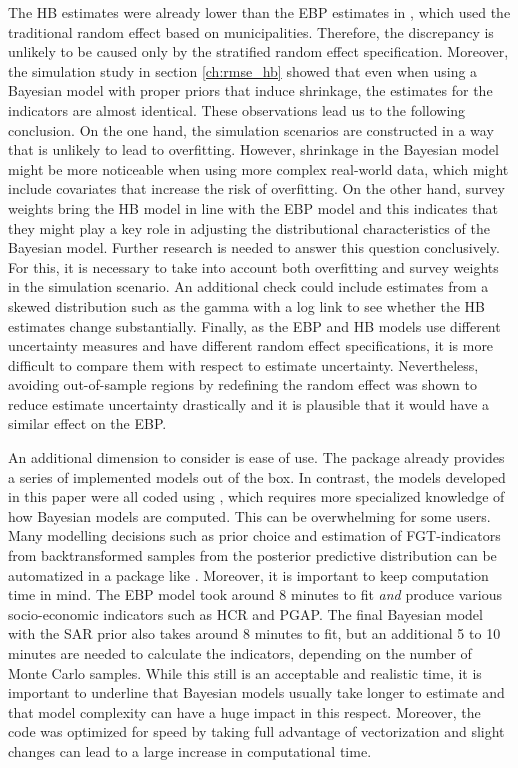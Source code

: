 The HB estimates were already lower than the EBP estimates in \cite{morelli_hierarchical_2021}, which used the traditional random effect based on municipalities.
Therefore, the discrepancy is unlikely to be caused only by the stratified random effect specification.
Moreover, the simulation study in section \ref{ch:rmse_hb} showed that even when using a Bayesian model with proper priors that induce shrinkage, the estimates for the indicators are almost identical.
These observations lead us to the following conclusion.
On the one hand, the simulation scenarios are constructed in a way that is unlikely to lead to overfitting.
However, shrinkage in the Bayesian model might be more noticeable when using more complex real-world data, which might include covariates that increase the risk of overfitting.
On the other hand, survey weights bring the HB model in line with the EBP model and this indicates that they might play a key role in adjusting the distributional characteristics of the Bayesian model.
Further research is needed to answer this question conclusively.
For this, it is necessary to take into account both overfitting and survey weights in the simulation scenario.
An additional check could include estimates from a skewed distribution such as the gamma with a log link to see whether the HB estimates change substantially.
Finally, as the EBP and HB models use different uncertainty measures and have different random effect specifications, it is more difficult to compare them with respect to estimate uncertainty.
Nevertheless, avoiding out-of-sample regions by redefining the random effect was shown to reduce estimate uncertainty drastically and it is plausible that it would have a similar effect on the EBP.

An additional dimension to consider is ease of use.
The  package already provides a series of implemented models out of the box.
In contrast, the models developed in this paper were all coded using , which requires more specialized knowledge of how Bayesian models are computed.
This can be overwhelming for some users.
Many modelling decisions such as prior choice and estimation of FGT-indicators from backtransformed samples from the posterior predictive distribution can be automatized in a package like .
Moreover, it is important to keep computation time in mind.
The EBP model took around 8 minutes to fit \textit{and} produce various socio-economic indicators such as HCR and PGAP.
The final Bayesian model with the SAR prior also takes around 8 minutes to fit, but an additional 5 to 10 minutes are needed to calculate the indicators, depending on the number of Monte Carlo samples.
While this still is an acceptable and realistic time, it is important to underline that Bayesian models usually take longer to estimate and that model complexity can have a huge impact in this respect.
Moreover, the  code was optimized for speed by taking full advantage of vectorization and slight changes can lead to a large increase in computational time.

